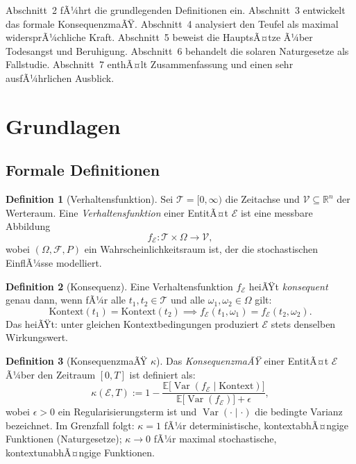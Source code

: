 ﻿\documentclass[a4paper,12pt]{article}
\DeclareMathOperator{\Var}{Var}
\theoremstyle{definition}
\newtheorem{definition}{Definition}
\begin{document}
Abschnitt~2 fÃ¼hrt die grundlegenden Definitionen ein. Abschnitt~3 entwickelt das formale KonsequenzmaÃŸ. Abschnitt~4 analysiert den Teufel als maximal widersprÃ¼chliche Kraft. Abschnitt~5 beweist die HauptsÃ¤tze Ã¼ber Todesangst und Beruhigung. Abschnitt~6 behandelt die solaren Naturgesetze als Fallstudie. Abschnitt~7 enthÃ¤lt Zusammenfassung und einen sehr ausfÃ¼hrlichen Ausblick.

\section{Grundlagen}

\subsection{Formale Definitionen}

\begin{definition}[Verhaltensfunktion]
Sei $\mathcal{T} = [0, \infty)$ die Zeitachse und $\mathcal{V} \subseteq \mathbb{R}^n$ der Werteraum. Eine \emph{Verhaltensfunktion} einer EntitÃ¤t $\mathcal{E}$ ist eine messbare Abbildung
\[
f_{\mathcal{E}}: \mathcal{T} \times \Omega \to \mathcal{V},
\]
wobei $(\Omega, \mathcal{F}, P)$ ein Wahrscheinlichkeitsraum ist, der die stochastischen EinflÃ¼sse modelliert.
\end{definition}

\begin{definition}[Konsequenz]
Eine Verhaltensfunktion $f_{\mathcal{E}}$ heiÃŸt \emph{konsequent} genau dann, wenn fÃ¼r alle $t_1, t_2 \in \mathcal{T}$ und alle $\omega_1, \omega_2 \in \Omega$ gilt:
\[
\text{Kontext}(t_1) = \text{Kontext}(t_2) \implies f_{\mathcal{E}}(t_1, \omega_1) = f_{\mathcal{E}}(t_2, \omega_2).
\]
Das heiÃŸt: unter gleichen Kontextbedingungen produziert $\mathcal{E}$ stets denselben Wirkungswert.
\end{definition}

\begin{definition}[KonsequenzmaÃŸ $\kappa$]
\label{def:kappa}
Das \emph{KonsequenzmaÃŸ} einer EntitÃ¤t $\mathcal{E}$ Ã¼ber den Zeitraum $[0, T]$ ist definiert als:
\[
\kappa(\mathcal{E}, T) := 1 - \frac{\mathbb{E}\bigl[\Var(f_{\mathcal{E}} \mid \text{Kontext})\bigr]}{\mathbb{E}\bigl[\Var(f_{\mathcal{E}})\bigr] + \epsilon},
\]
wobei $\epsilon > 0$ ein Regularisierungsterm ist und $\Var(\cdot \mid \cdot)$ die bedingte Varianz bezeichnet. Im Grenzfall folgt: $\kappa = 1$ fÃ¼r deterministische, kontextabhÃ¤ngige Funktionen (Naturgesetze); $\kappa \to 0$ fÃ¼r maximal stochastische, kontextunabhÃ¤ngige Funktionen.
\end{definition}
\end{document}
